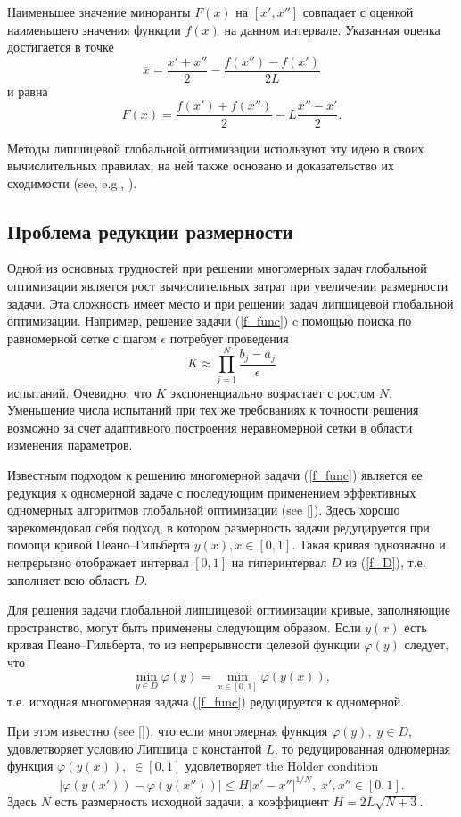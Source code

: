 \documentclass[preprint,12pt]{elsarticle}
\begin{document}
Наименьшее значение миноранты $F(x)$ на $[x', x'']$ совпадает с оценкой наименьшего значения функции $f(x)$ на данном интервале. Указанная оценка достигается в точке 
\[
\overline{x} = \frac{x'+x''}{2}-\frac{f(x'')-f(x')}{2L}
\] 
и равна
\[
F(\overline{x}) = \frac{f(x')+f(x'')}{2} -L \frac{x''-x'}{2}.
\]

Методы липшицевой глобальной оптимизации используют эту идею в своих вычислительных правилах; на ней также основано и доказательство их сходимости (see, e.g., ).

\subsection{Проблема редукции размерности} 

Одной из основных трудностей при решении многомерных задач глобальной оптимизации является рост вычислительных затрат при увеличении размерности задачи. Эта сложность имеет место и при решении задач липшицевой глобальной оптимизации.
Например, решение задачи (\ref{f_func}) c помощью поиска по равномерной сетке с шагом $\epsilon$ потребует проведения 
\[
K \approx \prod_{j=1}^N{\frac{b_j-a_j}{\epsilon}}
\]
испытаний. Очевидно, что $K$ экспоненциально возрастает с ростом $N$.
Уменьшение числа испытаний при тех же требованиях к точности решения возможно за счет адаптивного построения неравномерной сетки в области изменения параметров.

Известным подходом к решению многомерной задачи (\ref{f_func}) является ее редукция к одномерной задаче с последующим применением эффективных одномерных алгоритмов глобальной оптимизации (see []). Здесь хорошо зарекомендовал себя подход, в котором размерность задачи редуцируется при помощи кривой Пеано–Гильберта $y(x), x \in [0, 1]$.
Такая кривая однозначно и непрерывно отображает интервал $[0, 1]$ на гиперинтервал $D$ из (\ref{f_D}), т.е. заполняет всю область $D$.

Для решения задачи глобальной липшицевой оптимизации кривые, заполняющие пространство, могут быть применены следующим образом.
Если $y(x)$ есть кривая Пеано–Гильберта, то из непрерывности целевой функции $\varphi(y)$ следует, что
\[
\min_{y \in D } \varphi(y) = \min_{x \in [0,1] } \varphi(y(x)),
\]
т.е. исходная многомерная задача (\ref{f_func}) редуцируется к одномерной.


При этом известно (see []), что если многомерная функция $\varphi(y), \; y \in D,$  удовлетворяет условию Липшица с константой $L$, то редуцированная одномерная функция $\varphi(y(x)), \; \in [0,1]$ удовлетворяет the H{\"o}lder condition
\[
\left|\varphi(y(x'))-\varphi(y(x''))\right|\leq H\left|x'-x''\right|^{1/N}, \; x',x''\in[0,1].
\]
Здесь $N$ есть размерность исходной задачи, а коэффициент $ H=2 L \sqrt{N+3}$.
\end{document}

